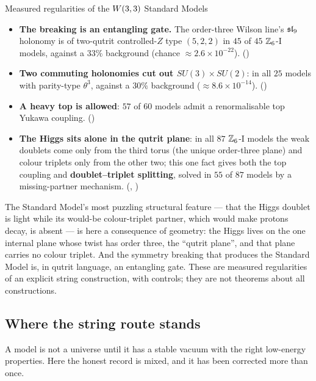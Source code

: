 \begin{result}{Measured regularities of the $W(3,3)$ Standard Models \hfill \tierC}
\begin{itemize}[leftmargin=1.2em]
\item \textbf{The breaking is an entangling gate.} The order-three Wilson line's $\mathfrak{sl}_9$
      holonomy is of two-qutrit controlled-$Z$ type $(5,2,2)$ in $45$ of $45$ $\mathbb{Z}_6$-I models,
      against a $33\%$ background (chance $\approx2.6\times10^{-22}$).
      ()
\item \textbf{Two commuting holonomies cut out $SU(3)\times SU(2)$}: in all $25$ models with
      parity-type $\theta^3$, against a $30\%$ background ($\approx8.6\times10^{-14}$).
      ()
\item \textbf{A heavy top is allowed}: $57$ of $60$ models admit a renormalisable top Yukawa
      coupling. ()
\item \textbf{The Higgs sits alone in the qutrit plane}: in all $87$ $\mathbb{Z}_6$-I models the weak
      doublets come only from the third torus (the unique order-three plane) and colour
      triplets only from the other two; this one fact gives both the top coupling and
      \textbf{doublet--triplet splitting}, solved in $55$ of $87$ models by a
      missing-partner mechanism. (, )
\end{itemize}
\end{result}

\begin{physical}
The Standard Model's most puzzling structural feature --- that the Higgs doublet is light
while its would-be colour-triplet partner, which would make protons decay, is absent --- is
here a consequence of geometry: the Higgs lives on the one internal plane whose twist has
order three, the ``qutrit plane'', and that plane carries no colour triplet. And the
symmetry breaking that produces the Standard Model is, in qutrit language, an entangling
gate. These are measured regularities of an explicit string construction, with controls;
they are not theorems about all constructions.
\end{physical}

\subsection{Where the string route stands}

A model is not a universe until it has a stable vacuum with the right low-energy
properties. Here the honest record is mixed, and it has been corrected more than once.

